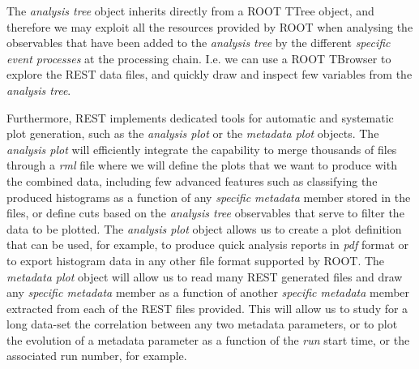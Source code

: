 
The \emph{analysis tree} object inherits directly from a ROOT TTree object, and therefore we may exploit all the resources provided by ROOT when analysing the observables that have been added to the \emph{analysis tree} by the different \emph{specific event processes} at the processing chain. I.e. we can use a ROOT TBrowser to explore the REST data files, and quickly draw and inspect few variables from the \emph{analysis tree}. 

Furthermore, REST implements dedicated tools for automatic and systematic plot generation, such as the \emph{analysis plot} or the \emph{metadata plot} objects. 
The \emph{analysis plot} will efficiently integrate the capability to merge thousands of files through a \emph{rml} file where we will define the plots that we want to produce with the combined data, including few advanced features such as classifying the produced histograms as a function of any \emph{specific metadata} member stored in the files, or define cuts based on the \emph{analysis tree} observables that serve to filter the data to be plotted. The \emph{analysis plot} object allows us to create a plot definition that can be used, for example, to produce quick analysis reports in \emph{pdf} format or to export histogram data in any other file format supported by ROOT.
The \emph{metadata plot} object will allow us to read many REST generated files and draw any \emph{specific metadata} member as a function of another \emph{specific metadata} member extracted from each of the REST files provided. This will allow us to study for a long data-set the correlation between any two metadata parameters, or to plot the evolution of a metadata parameter as a function of the \emph{run} start time, or the associated run number, for example.

